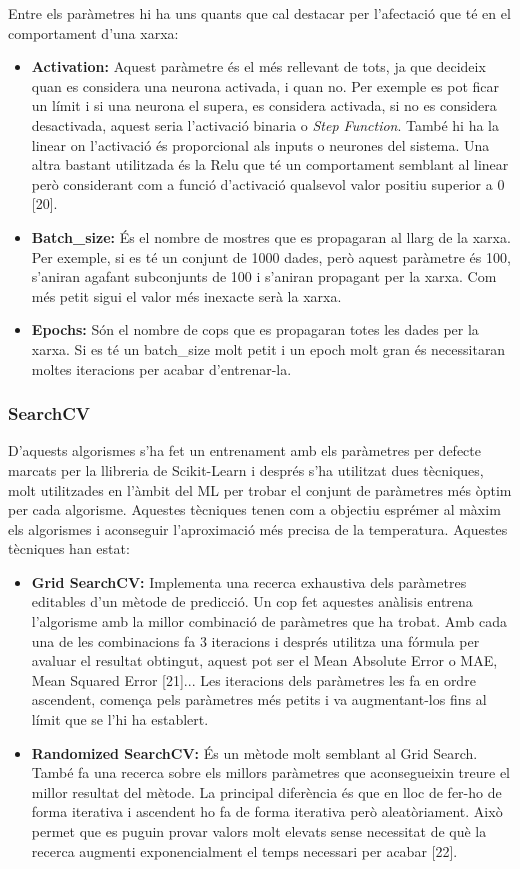 \documentclass[10pt,a4paper,twocolumn,twoside]{article}
\begin{document}
Entre els paràmetres hi ha uns quants que cal destacar per l'afectació que té en el comportament d'una xarxa:
\begin{itemize}
\item \textbf{Activation:} Aquest paràmetre és el més rellevant de tots, ja que decideix quan es considera una neurona activada, i quan no. Per exemple es pot ficar un límit i si una neurona el supera, es considera activada, si no es considera desactivada, aquest seria l'activació binaria o \textit{Step Function}. També hi ha la linear on l'activació és proporcional als inputs o neurones del sistema. Una altra bastant utilitzada és la Relu que té un comportament semblant al linear però considerant com a funció d'activació qualsevol valor positiu superior a 0 [20].
\item \textbf{Batch\_size:} És el nombre de mostres que es propagaran al llarg de la xarxa. Per exemple, si es té un conjunt de 1000 dades, però aquest paràmetre és 100, s'aniran agafant subconjunts de 100 i s'aniran propagant per la xarxa. Com més petit sigui el valor més inexacte serà la xarxa.
\item \textbf{Epochs:} Són el nombre de cops que es propagaran totes les dades per la xarxa. Si es té un batch\_size molt petit i un epoch molt gran és necessitaran moltes iteracions per acabar d'entrenar-la.
\end{itemize}

\subsubsection{SearchCV}
D'aquests algorismes s'ha fet un entrenament amb els paràmetres per defecte marcats per la llibreria de Scikit-Learn i després s'ha utilitzat dues tècniques, molt utilitzades en l'àmbit del ML per trobar el conjunt de paràmetres més òptim per cada algorisme. Aquestes tècniques tenen com a objectiu esprémer al màxim els algorismes i aconseguir l'aproximació més precisa de la temperatura. Aquestes tècniques han estat:
\begin{itemize}
\item \textbf{Grid SearchCV:} Implementa una recerca exhaustiva dels paràmetres editables d'un mètode de predicció. Un cop fet aquestes anàlisis entrena l'algorisme amb la millor combinació de paràmetres que ha trobat. Amb cada una de les combinacions fa 3 iteracions i després utilitza una fórmula per avaluar el resultat obtingut, aquest pot ser el Mean Absolute Error o MAE, Mean Squared Error [21]... Les iteracions dels paràmetres les fa en ordre ascendent, comença pels paràmetres més petits i va augmentant-los fins al límit que se l'hi ha establert.
\item \textbf{Randomized SearchCV:} És un mètode molt semblant al Grid Search. També fa una recerca sobre els millors paràmetres que aconsegueixin treure el millor resultat del mètode. La principal diferència és que en lloc de fer-ho de forma iterativa i ascendent ho fa de forma iterativa però aleatòriament. Això permet que es puguin provar valors molt elevats sense necessitat de què la recerca augmenti exponencialment el temps necessari per acabar [22].


\end{itemize}
\end{document}
